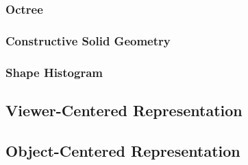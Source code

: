 \documentclass{article}
\begin{document}
\begin{multicols}{2}
\subsubsection{Octree}
\subsubsection{Constructive Solid Geometry}
\subsubsection{Shape Histogram}
\subsection{Viewer-Centered Representation}
\subsection{Object-Centered Representation}

\end{multicols}
\end{document}
